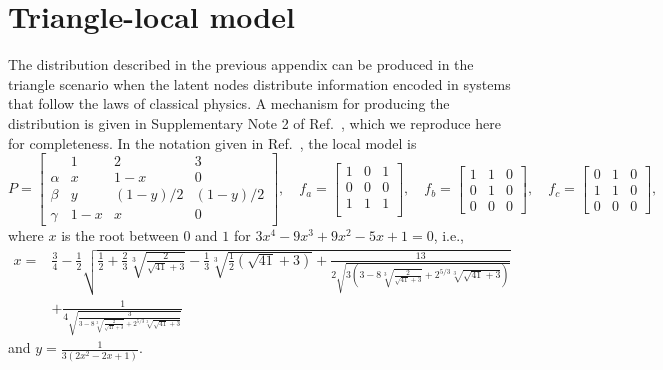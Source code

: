 \documentclass[aps,physrev,reprint,superscriptaddress,nofootinbib,twocolumn]{revtex4-2}
\begin{document}
\section{Triangle-local model}
\label{app:model}
The distribution described in the previous appendix can be produced in the triangle scenario when the latent nodes distribute information encoded in systems that follow the laws of classical physics.
A mechanism for producing the distribution is given in Supplementary Note 2 of Ref.~\cite{gisin2020}, which we reproduce here for completeness.
In the notation given in Ref.~\cite{gisin2020}, the local model is
\begin{equation*}
	P = \left[
	\begin{array}{c|ccc}
		& 1 & 2 & 3\\
		\hline
		\alpha & x & 1-x & 0\\
		\beta & y & (1-y)/2 & (1-y)/2\\
		\gamma & 1-x & x & 0
	\end{array} \right], \quad
	f_a =
	\begin{bmatrix}
		1 & 0 & 1\\
		0 & 0 & 0\\
		1 & 1 & 1\\
	\end{bmatrix}, \quad
	f_b =
	\begin{bmatrix}
		1 & 1 & 0 \\
		0 & 1 & 0\\
		0 & 0 & 0
	\end{bmatrix},\quad
	f_c =
	\begin{bmatrix}
		0 & 1 & 0 \\
		1 & 1 & 0\\
		0 & 0 & 0
	\end{bmatrix},
\end{equation*}
where $x$ is the root between $0$ and $1$ for $3x^4-9x^3+9x^2-5x+1=0$, i.e.,
\begin{align*}
    x=&\frac{3}{4}-\frac {1} {2}\sqrt{\frac{1}{2} + \frac{2}{3}\sqrt[3]{\frac{2}{\sqrt{41}+3}} - \frac13\sqrt[3]{\frac{1}{2}\left(\sqrt{41} + 3\right)} + \frac{13}{2\sqrt{3\left(3-8\sqrt[3]{\frac{2}{\sqrt{41}+3}} + 2^{5/3}\sqrt[3]{\sqrt{41}+3}\right)}}} \\
    &+\frac{1}{4\sqrt{\frac{3}{3-8\sqrt[3]{\frac{2}{\sqrt{41} + 3}} + 2^{5/3}\sqrt[3]{\sqrt{41} + 3}}}}
\end{align*}
and $y=\frac{1}{3(2x^2-2x+1)}$.
\end{document}
